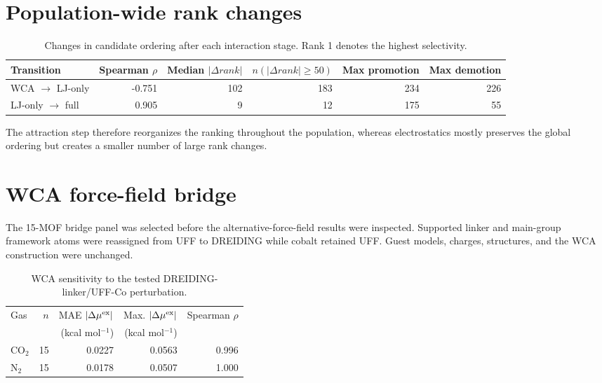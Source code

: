 \documentclass[11pt,a4paper]{article}
\begin{document}
\section{Population-wide rank changes}

\begin{table}[H]
\centering
\caption{Changes in candidate ordering after each interaction stage. Rank 1 denotes the highest selectivity.}
\footnotesize
\setlength{\tabcolsep}{3.8pt}
\begin{tabular}{lrrrrr}
\toprule
Transition & Spearman $\rho$ & Median $|\Delta rank|$ & $n(|\Delta rank|\geq50)$ & Max promotion & Max demotion\\
\midrule
WCA $\rightarrow$ LJ-only & -0.751 & 102 & 183 & 234 & 226\\
LJ-only $\rightarrow$ full & 0.905 & 9 & 12 & 175 & 55\\
\bottomrule
\end{tabular}
\end{table}

The attraction step therefore reorganizes the ranking throughout the population, whereas electrostatics mostly preserves the global ordering but creates a smaller number of large rank changes.

\section{WCA force-field bridge}

The 15-MOF bridge panel was selected before the alternative-force-field results were inspected. Supported linker and main-group framework atoms were reassigned from UFF to DREIDING while cobalt retained UFF. Guest models, charges, structures, and the WCA construction were unchanged.

\begin{table}[H]
\centering
\caption{WCA sensitivity to the tested DREIDING-linker/UFF-Co perturbation.}
\begin{tabular}{lrrrr}
\toprule
Gas & $n$ & MAE $|\Delta\mu^{\rm ex}|$ & Max. $|\Delta\mu^{\rm ex}|$ & Spearman $\rho$\\
 & & (kcal mol$^{-1}$) & (kcal mol$^{-1}$) & \\
\midrule
CO$_2$ & 15 & 0.0227 & 0.0563 & 0.996\\
N$_2$ & 15 & 0.0178 & 0.0507 & 1.000\\
\bottomrule
\end{tabular}
\end{table}
\end{document}
